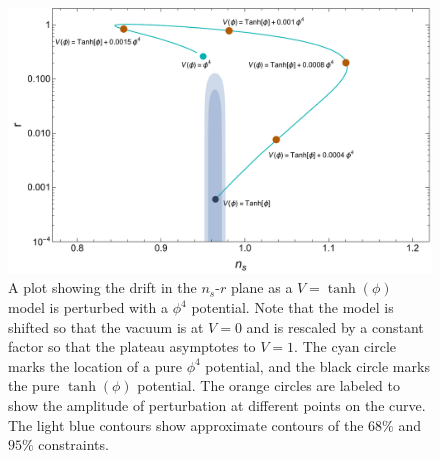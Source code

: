 \documentclass[a4paper,11pt]{article}
\def\nsr{$n_s$-$r$ }
\begin{document}
\begin{figure}[H]
	\centering
	\includegraphics[width=\textwidth]{figures/TanhDriftLabeledPointsPlanck.pdf}
	\caption[Drift in \nsr plane for Tanh model with perturbations (more detailed plot).]{A plot showing the drift in the \nsr plane as a $V=\tanh(\phi)$ model is perturbed with a $\phi^4$ potential. Note that the model is shifted so that the vacuum is at $V=0$ and is rescaled by a constant factor so that the plateau asymptotes to $V=1$. The cyan circle marks the location of a pure $\phi^4$ potential, and the black circle marks the pure $\tanh(\phi)$ potential. The orange circles are labeled to show the amplitude of perturbation at different points on the curve. The light blue contours show approximate contours of the \citet{Planck2015} $68\%$ and $95\%$ constraints.}
	\label{fig:LFP_tanh_drift_detail}
\end{figure}
\end{document}
